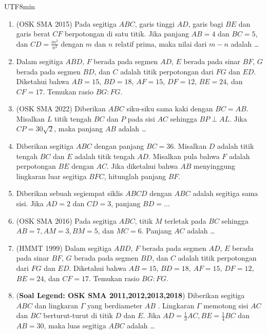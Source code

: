 \documentclass[12pt]{scrartcl}
\begin{document}
\begin{CJK*}{UTF8}{min}
\begin{enumerate}
    \item (OSK SMA 2015) Pada segitiga $ABC$, garis tinggi $AD$, garis bagi $BE$ dan garis berat $CF$ berpotongan di satu titik. Jika panjang $AB = 4$ dan $BC = 5$, dan $CD = \frac{m^2}{n^2}$ dengan $m$ dan $n$ relatif prima, maka nilai dari $m - n$ adalah \ldots

    \item Dalam segitiga $ABD$, $F$ berada pada segmen $AD$, $E$ berada pada sinar $BF$, $G$ berada pada segmen $BD$, dan $C$ adalah titik perpotongan dari $FG$ dan $ED$. Diketahui bahwa $AB = 15$, $BD = 18$, $AF = 15$, $DF = 12$, $BE = 24$, dan $CF = 17$. Temukan rasio $BG : FG$.

    \item (OSK SMA 2022) Diberikan $ABC$ siku-siku sama kaki dengan $BC=AB$. Misalkan $L$ titik tengah $BC$ dan $P$ pada sisi $AC$ sehingga $BP \perp AL$. Jika $CP=30\sqrt{2}$, maka panjang $AB$ adalah \ldots

    \item Diberikan segitiga $ABC$ dengan panjang $BC = 36$. Misalkan $D$ adalah titik tengah $BC$ dan $E$ adalah titik tengah $AD$. Misalkan pula bahwa $F$ adalah perpotongan $BE$ dengan $AC$. Jika diketahui bahwa $AB$ menyinggung lingkaran luar segitiga $BFC$, hitunglah panjang $BF$.

    \item Diberikan sebuah segiempat siklis $ABCD$ dengan $ABC$ adalah segitiga sama sisi. Jika $AD=2$ dan $CD=3$, panjang $BD=\dots$

    \item (OSK SMA 2016) Pada segitiga $ABC$, titik $M$ terletak pada $BC$ sehingga $AB=7, AM=3, BM=5$, dan $MC=6$. Panjang $AC$ adalah \dots

    \item (HMMT 1999) Dalam segitiga $ABD$, $F$ berada pada segmen $AD$, $E$ berada pada sinar $BF$, $G$ berada pada segmen $BD$, dan $C$ adalah titik perpotongan dari $FG$ dan $ED$. Diketahui bahwa $AB = 15$, $BD = 18$, $AF = 15$, $DF = 12$, $BE = 24$, dan $CF = 17$. Temukan rasio $BG : FG$.

    \item (\textbf{Soal Legend: OSK SMA 2011,2012,2013,2018}) Diberikan segitiga $ABC$ dan lingkaran $\Gamma$ yang berdiameter $AB$ . Lingkaran $\Gamma$ memotong sisi $AC$ dan $BC$ berturut-turut di titik $D$ dan $E$. Jika $AD = \frac13 AC, BE =\frac14 BC$ dan $AB = 30$, maka luas segitiga $ABC$ adalah \dots


\end{enumerate}
\end{CJK*}
\end{document}

